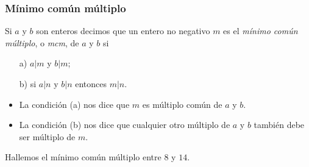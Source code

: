 \documentclass[handout]{beamer} %
\newcommand{\mcm}{\operatorname{mcm}}
\begin{document}
    
    \begin{frame}\frametitle{Mínimo común múltiplo}
        
        
        \begin{definicion}
            Si $a$ y $b$ son enteros decimos que un entero no negativo $m$ es el {\em
                mínimo común múltiplo}, o {\em mcm}, de $a$ y $b$ si
            \begin{enumerate}
                \item[a)] $ a|m$ y $b|m$;
                \item[b)] si $ a|n $ y $b|n$ entonces $ m|n$.
            \end{enumerate}
        \end{definicion}\pause
        \vskip 0.6cm
        \begin{itemize}
            \item La condición (a) nos dice que $m$ es múl\-ti\-plo común de $a$ y $b$. 
            \item La condición (b) nos dice que cualquier otro múltiplo de $a$ y $b$ también debe ser múltiplo de $m$.
        \end{itemize}
        
    \end{frame}
    
    
    \begin{frame}
        
        \begin{ejemplo}
            Hallemos el mínimo común múltiplo entre $8$ y $14$.
        \end{ejemplo}\pause
        
        
        
        
        
    \end{frame}
    
\end{document}

